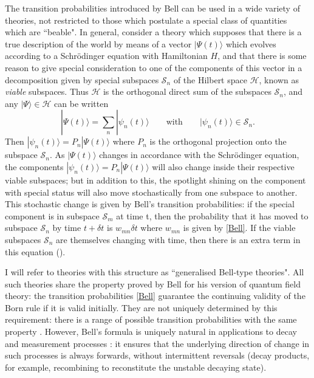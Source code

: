 \documentclass[12pt,a4paper,reqno]{article}
\renewcommand{\(}{\left(}
\renewcommand{\)}{\right)}
\renewcommand{\.}{\centerdot}
\renewcommand{\S}{\mathcal{S}}
\renewcommand{\H}{\mathcal{H}}
\newcommand{\1}{\mathbf{1}}
\newcommand{\<}{\langle}
\renewcommand{\>}{\rangle}
\theoremstyle{definition}
\theoremstyle{remark}
\numberwithin{equation}{section}
\begin{document}
The transition probabilities introduced by Bell can be used in a wide variety of theories, not restricted to those which postulate a special class of quantities which are ``beable". In general, consider a theory which supposes that there is a true description of the world by means of a vector $|\Psi(t)\>$ which evolves according to a Schr\"odinger equation with Hamiltonian $H$, and that there is some reason to give special consideration to one of the components of this vector in a decomposition given by special subspaces $\S_n$ of the Hilbert space $\H$, known as \emph{viable} subspaces. Thus $\H$ is the orthogonal direct sum of the subspaces $\S_n$, and any $|\Psi\> \in \H$ can be written
\[
|\Psi(t)\> = \sum_n|\psi_n(t)\> \qquad \text{with} \qquad |\psi_n(t)\>\in\S_n.
\]
Then $|\psi_n(t)\> = P_n|\Psi(t)\>$ where $P_n$ is the orthogonal projection onto the subspace $\S_n$. As $|\Psi(t)\>$ changes in accordance with the Schr\"odinger equation, the components $|\psi_n(t)\> = P_n|\Psi(t)\>$ will also change inside their respective viable subspaces; but in addition to this, the spotlight shining on the component with special status will also move stochastically from one subspace to another. This stochastic change is given by Bell's transition probabilities: if the special component is in subspace $\S_m$ at time t, then the probability that it has moved to subspace $\S_n$ by time $t + \delta t$ is $w_{mn}\delta t$ where $w_{mn}$ is given by \eqref{Bell}. If the viable subspaces $\S_n$ are themselves changing with time, then there is an extra term in this equation (\cite{BacciaDickson, verdammte}).

I will refer to theories with this structure as ``generalised Bell-type theories". All such theories share the property proved by Bell for his version of quantum field theory: the transition probabilities \eqref{Bell} guarantee the continuing validity of the Born rule if it is valid initially. They are not uniquely determined by this requirement: there is a range of possible transition probabilities with the same property \cite{BacciaDickson}. However, Bell's formula is uniquely natural in applications to decay \cite{verdammte} and measurement processes \cite{singleworld, Hollowood:classical}: it ensures that the underlying direction of change in such processes is always forwards, without intermittent reversals (decay products, for example, recombining to reconstitute the unstable decaying state).
\end{document}
